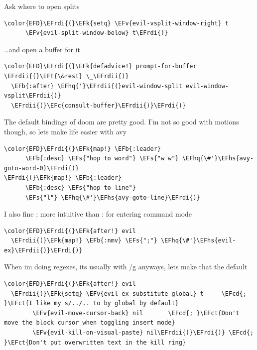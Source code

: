 \documentclass{scrartcl}
\newcommand{\EFk}[1]{\textcolor{EFk}{#1}} %
\newcommand{\EFt}[1]{\textcolor{EFt}{#1}} %
\newcommand{\EFs}[1]{\textcolor{EFs}{#1}} %
\newcommand{\EFb}[1]{\textcolor{EFb}{#1}} %
\newcommand{\EFct}[1]{\textcolor{EFct}{#1}} %
\newcommand{\EFc}[1]{\textcolor{EFc}{#1}} %
\newcommand{\EFv}[1]{\textcolor{EFv}{#1}} %
\newcommand{\EFcd}[1]{\textcolor{EFcd}{#1}} %
\newcommand{\EFhq}[1]{#1} %
\newcommand{\EFhs}[1]{#1} %
\newcommand{\EFrdi}[1]{#1} %
\newcommand{\EFrdii}[1]{#1} %
\begin{document}
Ask where to open splits
\begin{Code}
\begin{Verbatim}[]
\color{EFD}\EFrdi{(}\EFk{setq} \EFv{evil-vsplit-window-right} t
      \EFv{evil-split-window-below} t\EFrdi{)}
\end{Verbatim}
\end{Code}

\ldots{}and open a buffer for it
\begin{Code}
\begin{Verbatim}[]
\color{EFD}\EFrdi{(}\EFk{defadvice!} prompt-for-buffer \EFrdii{(}\EFt{\&rest} \_\EFrdii{)}
  \EFb{:after} \EFhq{'}\EFrdii{(}evil-window-split evil-window-vsplit\EFrdii{)}
  \EFrdii{(}\EFc{consult-buffer}\EFrdii{)}\EFrdi{)}
\end{Verbatim}
\end{Code}

The default bindings of doom are pretty good. I'm not so good with motions though, so lets make life easier with avy
\begin{Code}
\begin{Verbatim}[]
\color{EFD}\EFrdi{(}\EFk{map!} \EFb{:leader}
      \EFb{:desc} \EFs{"hop to word"} \EFs{"w w"} \EFhq{\#'}\EFhs{avy-goto-word-0}\EFrdi{)}
\EFrdi{(}\EFk{map!} \EFb{:leader}
      \EFb{:desc} \EFs{"hop to line"}
      \EFs{"l"} \EFhq{\#'}\EFhs{avy-goto-line}\EFrdi{)}
\end{Verbatim}
\end{Code}

I also fine ; more intuitive than : for entering command mode
\begin{Code}
\begin{Verbatim}[]
\color{EFD}\EFrdi{(}\EFk{after!} evil
  \EFrdii{(}\EFk{map!} \EFb{:nmv} \EFs{";"} \EFhq{\#'}\EFhs{evil-ex}\EFrdii{)}\EFrdi{)}
\end{Verbatim}
\end{Code}

When im doing regexes, its usually with /g anyways, lets make that the default
\begin{Code}
\begin{Verbatim}[]
\color{EFD}\EFrdi{(}\EFk{after!} evil
  \EFrdii{(}\EFk{setq} \EFv{evil-ex-substitute-global} t     \EFcd{; }\EFct{I like my s/../.. to by global by default}
        \EFv{evil-move-cursor-back} nil       \EFcd{; }\EFct{Don't move the block cursor when toggling insert mode}
        \EFv{evil-kill-on-visual-paste} nil\EFrdii{)}\EFrdi{)} \EFcd{; }\EFct{Don't put overwritten text in the kill ring}
\end{Verbatim}
\end{Code}
\end{document}
